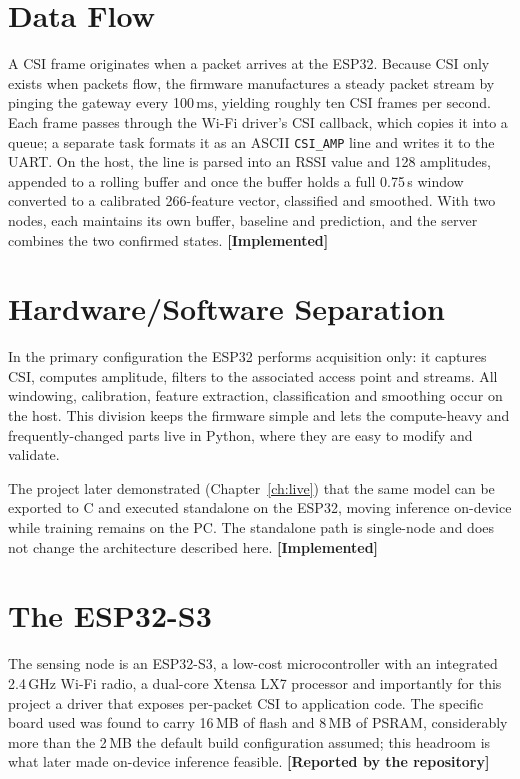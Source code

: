 \documentclass[11pt,a4paper,oneside]{report}
\newcommand{\evidencetag}[2]{{\small\sffamily\bfseries\textcolor{#1}{[#2]}}}
\newcommand{\Impl}{\evidencetag{good}{Implemented}}
\newcommand{\Repo}{\evidencetag{neutralgrey}{Reported by the repository}}
\newcommand{\code}[1]{\texttt{\small #1}}
\begin{document}
\section{Data Flow}

A CSI frame originates when a packet arrives at the ESP32. Because CSI only
exists when packets flow, the firmware manufactures a steady packet stream by
pinging the gateway every 100\,ms, yielding roughly ten CSI frames per second.
Each frame passes through the Wi-Fi driver's CSI callback, which copies it into
a queue; a separate task formats it as an ASCII \code{CSI\_AMP} line and writes
it to the UART. On the host, the line is parsed into an RSSI value and 128
amplitudes, appended to a rolling buffer and  once the buffer holds a full
0.75\,s window  converted to a calibrated 266-feature vector, classified and
smoothed. With two nodes, each maintains its own buffer, baseline and
prediction, and the server combines the two confirmed states. \Impl

\section{Hardware/Software Separation}

In the primary configuration the ESP32 performs acquisition only: it captures
CSI, computes amplitude, filters to the associated access point and streams.
All windowing, calibration, feature extraction, classification and smoothing
occur on the host. This division keeps the firmware simple and lets the
compute-heavy and frequently-changed parts live in Python, where they are easy
to modify and validate.

The project later demonstrated (Chapter~\ref{ch:live}) that the same model can
be exported to C and executed standalone on the ESP32, moving inference
on-device while training remains on the PC. The standalone path is single-node
and does not change the architecture described here. \Impl


\label{ch:hw}

\section{The ESP32-S3}

The sensing node is an ESP32-S3, a low-cost microcontroller with an integrated
2.4\,GHz Wi-Fi radio, a dual-core Xtensa LX7 processor and importantly for
this project a driver that exposes per-packet CSI to application code. The
specific board used was found to carry 16\,MB of flash and 8\,MB of PSRAM,
considerably more than the 2\,MB the default build configuration assumed; this
headroom is what later made on-device inference feasible. \Repo
\end{document}
